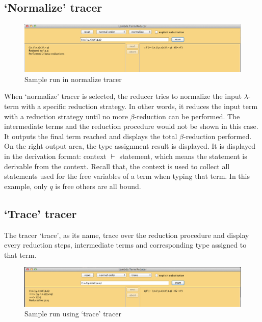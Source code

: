 \subsection{`Normalize' tracer}

\begin{figure}[ht]
\centering
\includegraphics[width=\textwidth]{pics/normalize}
\caption{Sample run in normalize tracer}
\label{fig:normalize}
\end{figure}

When `normalize' tracer is selected, the reducer tries to normalize the input $\lambda$-term with a specific reduction strategy. In other words, it reduces the input term with a reduction strategy until no more $\beta$-reduction can be performed. The intermediate terms and the reduction procedure would not be shown in this case. It outputs the final term reached and displays the total $\beta$-reduction performed. On the right output area, the type assignment result is displayed. It is displayed in the derivation format: context $\vdash$ statement, which means the statement is derivable from the context. Recall that, the context is used to collect all statements used for the free variables of a term when typing that term. In this example, only $q$ is free others are all bound. 

\subsection{`Trace' tracer}

The tracer `trace', as its name, trace over the reduction procedure and display every reduction steps, intermediate terms and corresponding type assigned to that term.    

\begin{figure}[ht]
\centering
\includegraphics[width=\textwidth]{pics/trace}
\caption{Sample run using `trace' tracer}
\label{fig:tracer}
\end{figure}


